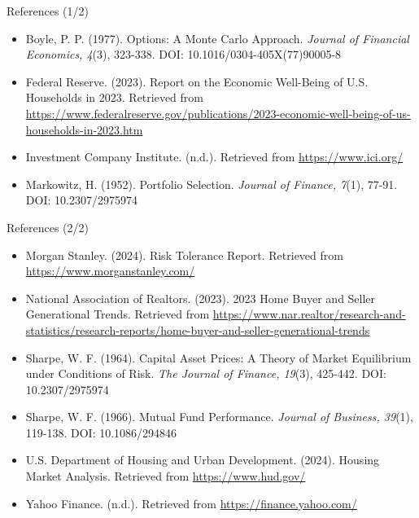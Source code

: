 \documentclass{beamer}
\begin{document}
\begin{frame}{References (1/2)}
    \begin{block}{}
        \begin{itemize}
            \item Boyle, P. P. (1977). Options: A Monte Carlo Approach. \textit{Journal of Financial Economics, 4}(3), 323-338. DOI: 10.1016/0304-405X(77)90005-8
            \item Federal Reserve. (2023). Report on the Economic Well-Being of U.S. Households in 2023. Retrieved from \url{https://www.federalreserve.gov/publications/2023-economic-well-being-of-us-households-in-2023.htm}
            \item Investment Company Institute. (n.d.). Retrieved from \url{https://www.ici.org/}
            \item Markowitz, H. (1952). Portfolio Selection. \textit{Journal of Finance, 7}(1), 77-91. DOI: 10.2307/2975974
        \end{itemize}
    \end{block}
\end{frame}

\begin{frame}{References (2/2)}
    \begin{block}{}
        \begin{itemize}
            \item Morgan Stanley. (2024). Risk Tolerance Report. Retrieved from \url{https://www.morganstanley.com/}
            \item National Association of Realtors. (2023). 2023 Home Buyer and Seller Generational Trends. Retrieved from \url{https://www.nar.realtor/research-and-statistics/research-reports/home-buyer-and-seller-generational-trends}
            \item Sharpe, W. F. (1964). Capital Asset Prices: A Theory of Market Equilibrium under Conditions of Risk. \textit{The Journal of Finance, 19}(3), 425-442. DOI: 10.2307/2975974
            \item Sharpe, W. F. (1966). Mutual Fund Performance. \textit{Journal of Business, 39}(1), 119-138. DOI: 10.1086/294846
            \item U.S. Department of Housing and Urban Development. (2024). Housing Market Analysis. Retrieved from \url{https://www.hud.gov/}
            \item Yahoo Finance. (n.d.). Retrieved from \url{https://finance.yahoo.com/}
        \end{itemize}
    \end{block}
\end{frame}
\end{document}

